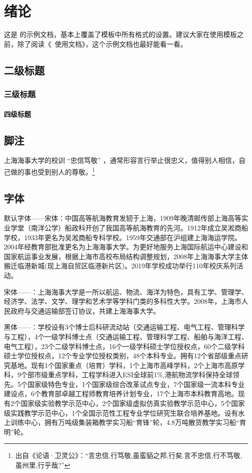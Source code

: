 \chapter{绪论}

这是 \shmtuthesis 的示例文档，基本上覆盖了模板中所有格式的设置。建议大家在使用模板之前，除了阅读《\shmtuthesis\ 使用文档》，这个示例文档也最好能看一看。

\section{二级标题}

\subsection{三级标题}

\subsubsection{四级标题}

\section{脚注}

上海海事大学的校训 “忠信笃敬” ，通常形容言行举止很忠义，值得别人相信，自己做的事也受到别人的尊敬。\footnote{出自《论语·卫灵公》：“言忠信,行笃敬,虽蛮貊之邦,行矣.言不忠信,行不笃敬,虽州里,行乎哉?”}

\section{字体}
{默认字体——宋体：中国高等航海教育发轫于上海，1909年晚清邮传部上海高等实业学堂（南洋公学）船政科开创了我国高等航海教育的先河。1912年成立吴淞商船学校，1933年更名为吴淞商船专科学校。1959年交通部在沪组建上海海运学院。2004年经教育部批准更名为上海海事大学。为更好地服务上海国际航运中心建设和国家航运事业发展，根据上海市高校布局结构调整规划，2008年上海海事大学主体搬迁临港新城(现上海自贸区临港新片区)。2019年学校成功举行110年校庆系列活动。} 

{宋体——：\songti 上海海事大学是一所以航运、物流、海洋为特色，具有工学、管理学、经济学、法学、文学、理学和艺术学等学科门类的多科性大学。2008年，上海市人民政府与交通运输部签订协议，共建上海海事大学。}

{黑体——：\heiti 学校设有3个博士后科研流动站（交通运输工程、电气工程、管理科学与工程），4个一级学科博士点（交通运输工程、管理科学工程、船舶与海洋工程、电气工程），23个二级学科博士点，16个一级学科硕士学位授权点，60个二级学科硕士学位授权点，12个专业学位授权类别，48个本科专业。拥有12个省部级重点研究基地。现有1个国家重点（培育）学科，1个上海市高峰学科，2个上海市高原学科，9个部市级重点学科，工程学科进入ESI全球前1\%,港航物流学科保持全球领先。5个国家级特色专业，1个国家级综合改革试点专业，7个国家级一流本科专业建设点，6个教育部卓越工程师教育培养计划专业，17个上海市本科教育高地。现有2个国家级实验教学示范中心，2个国家级虚拟仿真实验教学示范中心，5个国家级实践教学示范中心，1个全国示范性工程专业学位研究生联合培养基地。设有水上训练中心，拥有万吨级集装箱教学实习船“育锋”轮，4.8万吨散货教学实习船“育明”轮。}

